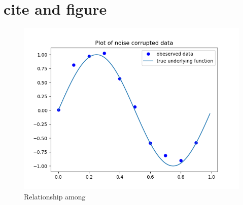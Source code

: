 \documentclass[letterpaper, 11pt]{article}
\begin{document}
\section*{cite and figure}




\begin{figure}[!t]
  \includegraphics[width=\linewidth]{fig/figure_3.png}
  \caption{Relationship among }
  \label{fig:relation1}
\end{figure}


\end{document}
